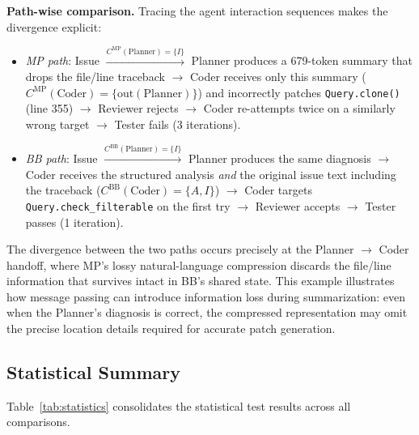 \documentclass{ieeeaccess}
\begin{document}
\textbf{Path-wise comparison.} Tracing the agent interaction sequences makes the divergence explicit:
\begin{itemize}
\item \emph{MP path}: Issue $\xrightarrow{C^{\text{MP}}(\text{Planner})=\{I\}}$ Planner produces a 679-token summary that drops the file/line traceback $\rightarrow$ Coder receives only this summary ($C^{\text{MP}}(\text{Coder})=\{\text{out}(\text{Planner})\}$) and incorrectly patches \texttt{Query.clone()} (line 355) $\rightarrow$ Reviewer rejects $\rightarrow$ Coder re-attempts twice on a similarly wrong target $\rightarrow$ Tester fails (3 iterations).
\item \emph{BB path}: Issue $\xrightarrow{C^{\text{BB}}(\text{Planner})=\{I\}}$ Planner produces the same diagnosis $\rightarrow$ Coder receives the structured analysis \emph{and} the original issue text including the traceback ($C^{\text{BB}}(\text{Coder})=\{A, I\}$) $\rightarrow$ Coder targets \texttt{Query.check\_filterable} on the first try $\rightarrow$ Reviewer accepts $\rightarrow$ Tester passes (1 iteration).
\end{itemize}
The divergence between the two paths occurs precisely at the Planner $\rightarrow$ Coder handoff, where MP's lossy natural-language compression discards the file/line information that survives intact in BB's shared state. This example illustrates how message passing can introduce information loss during summarization: even when the Planner's diagnosis is correct, the compressed representation may omit the precise location details required for accurate patch generation.

\subsection{Statistical Summary}
\label{sec:stat-summary}

Table~\ref{tab:statistics} consolidates the statistical test results across all comparisons.
\end{document}
